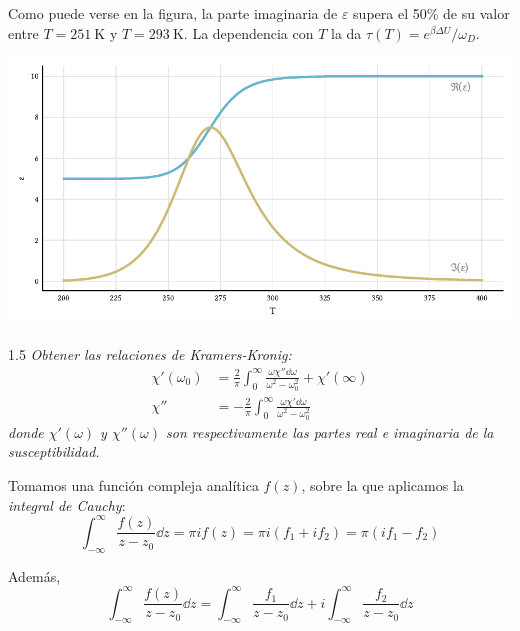 \documentclass{tufte-book}
\newcommand{\sub}[1]{_{{\scriptscriptstyle\mathit{#1}}}}
\begin{document}
Como puede verse en la figura, la parte imaginaria de $ε$ supera el
50\% de su valor entre $T = \SI{251}{\kelvin}$ y
$T=\SI{293}{\kelvin}$. La dependencia con $T$ la da $τ(T) = e^{βΔU}/ω\sub{D}$.

\begin{fullwidth}
  \centering
  \includegraphics{figures/debye_1_4.pdf}
\end{fullwidth}

\begin{tcolorbox}[halign=left]
  \lettrine[lines=2]{\color{ExerciseNumberColor}1.5}{}
  \emph{Obtener las relaciones de Kramers-Kronig:}
  \begin{align*}
    χ'(ω_0)
    &= \frac{2}{π} \int_0^∞ \frac{ω χ'' \dd{ω}}{ω^2-ω_0^2} + χ'(∞) \\
    χ''
    &= - \frac{2}{π} \int_0^∞ \frac{ωχ' \dd{ω}}{ω^2-ω_0^2}
  \end{align*}
  \emph{donde $χ'(ω)$ y $χ''(ω)$ son respectivamente las partes real e
    imaginaria de la susceptibilidad.}
\end{tcolorbox}

Tomamos una función compleja analítica $f(z)$,
sobre la que aplicamos la \emph{integral de Cauchy}:
\begin{equation}
  \int_{-∞}^∞ \frac{f(z)}{z-z_0} \dd{z} = π i f(z) = π i (f_1 + i f_2)
  = π (if_1 - f_2)
  \label{eq:cauchyint}
\end{equation}

Además,
\begin{equation}
  \int_{-∞}^∞ \frac{f(z)}{z-z_0} \dd{z} =
  \int_{-∞}^∞ \frac{f_1}{z-z_0} \dd{z} + i\int_{-∞}^∞ \frac{f_2}{z-z_0} \dd{z}
  \label{eq:splitme}
\end{equation}
\end{document}
